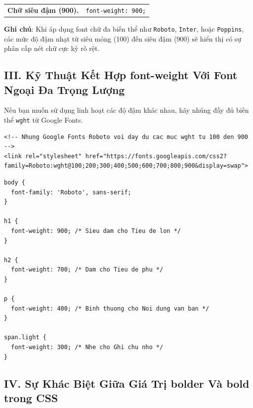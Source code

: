 \documentclass[11pt,oneside]{book}
\newcommand{\codeinline}[1]{\textcolor{accentOrange}{\texttt{#1}}}
\begin{document}
\begin{browserWindow}
\begin{tcolorbox}[arc=6pt, colback=white, colframe=blue!30, boxrule=1pt, top=12pt, bottom=12pt, left=16pt, right=16pt]
\begin{tabular}{@{}l l@{}}
    {\sffamily\bfseries\fontsize{13}{17}\selectfont\color{black} Chữ siêu đậm (900).}     & {\sffamily\small\color{gray!70} \codeinline{font-weight: 900;}} \\
  \end{tabular}\par\vspace{10pt}
  {\sffamily\small\color{gray!80} \textbf{Ghi chú}: Khi áp dụng font chữ đa biến thể như \codeinline{Roboto}, \codeinline{Inter}, hoặc \codeinline{Poppins}, các mức độ đậm nhạt từ siêu mỏng (100) đến siêu đậm (900) sẽ hiển thị có sự phân cấp nét chữ cực kỳ rõ rệt.}
\end{tcolorbox}
\end{browserWindow}

\subsection*{III. Kỹ Thuật Kết Hợp font-weight Với Font Ngoại Đa Trọng Lượng}

Nếu bạn muốn sử dụng linh hoạt các độ đậm khác nhau, hãy nhúng đầy đủ biến thể \codeinline{wght} từ Google Fonts.

\begin{codeWindow}
\begin{lstlisting}[language=HTML5]
<!-- Nhung Google Fonts Roboto voi day du cac muc wght tu 100 den 900 -->
<link rel="stylesheet" href="https://fonts.googleapis.com/css2?family=Roboto:wght@100;200;300;400;500;600;700;800;900&display=swap">
\end{lstlisting}
\end{codeWindow}

\begin{codeWindow}
\begin{lstlisting}[language=CSS3]
body {
  font-family: 'Roboto', sans-serif;
}

h1 {
  font-weight: 900; /* Sieu dam cho Tieu de lon */
}

h2 {
  font-weight: 700; /* Dam cho Tieu de phu */
}

p {
  font-weight: 400; /* Binh thuong cho Noi dung van ban */
}

span.light {
  font-weight: 300; /* Nhe cho Ghi chu nho */
}
\end{lstlisting}
\end{codeWindow}

\subsection*{IV. Sự Khác Biệt Giữa Giá Trị bolder Và bold trong CSS}
\end{document}
